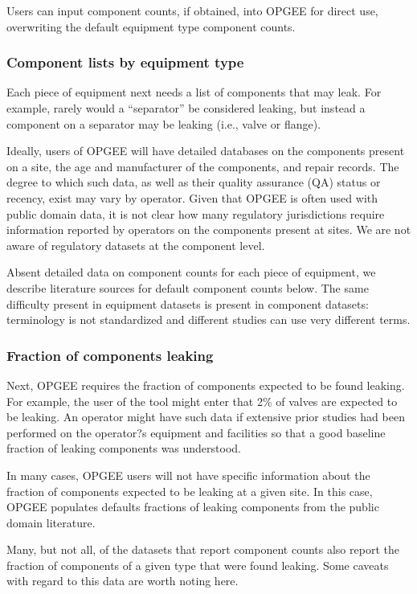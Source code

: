 \documentclass[11pt]{report}
\begin{document}
Users can input component counts, if obtained, into OPGEE for direct use, overwriting the default equipment type component counts.


\subsubsection{Component lists by equipment type}

Each piece of equipment next needs a list of components that may leak. For example, rarely would a ``separator'' be considered leaking, but instead a component on a separator may be leaking (i.e., valve or flange). 

Ideally, users of OPGEE will have detailed databases on the components present on a site, the age and manufacturer of the components, and repair records. The degree to which such data, as well as their quality assurance (QA) status or recency, exist may vary by operator. Given that OPGEE is often used with public domain data, it is not clear how many regulatory jurisdictions require information reported by operators on the components present at sites. We are not aware of regulatory datasets at the component level.

Absent detailed data on component counts for each piece of equipment, we describe literature sources for default component counts below. The same difficulty present in equipment datasets is present in component datasets: terminology is not standardized and different studies can use very different terms. 


\subsubsection{Fraction of components leaking}

Next, OPGEE requires the fraction of components expected to be found leaking. For example, the user of the tool might enter that 2\% of valves are expected to be leaking. An operator might have such data if extensive prior studies had been performed on the operator?s equipment and facilities so that a good baseline fraction of leaking components was understood.

In many cases, OPGEE users will not have specific information about the fraction of components expected to be leaking at a given site. In this case, OPGEE populates defaults fractions of leaking components from the public domain literature.

Many, but not all, of the datasets that report component counts also report the fraction of components of a given type that were found leaking. Some caveats with regard to this data are worth noting here.
\end{document}
